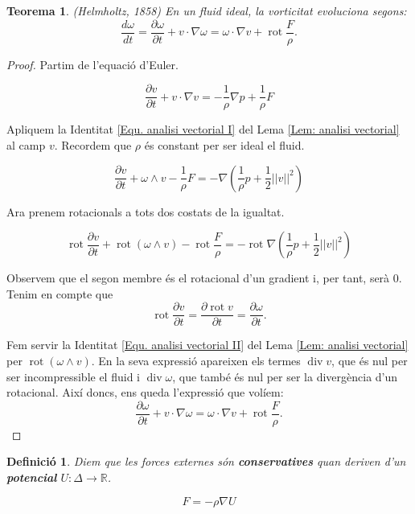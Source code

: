 \documentclass{article}
\numberwithin{equation}{section}
\DeclareMathOperator{\diver}{div}
\DeclareMathOperator{\rot}{rot}
\newtheorem{teorema}{Teorema}[section]
\newtheorem{definicio}{Definici\'{o}}[section]
\begin{document}
\begin{teorema}\label{Teo: Helmholtz}
(Helmholtz, 1858) En un fluid ideal, la vorticitat evoluciona segons:
\begin{equation}
\frac{d\omega}{dt}=\frac{\partial\omega}{\partial t}+v\cdot\nabla\omega=\omega\cdot\nabla v+\rot\frac{F}{\rho}.
\end{equation}
\end{teorema}
\begin{proof}
Partim de l'equaci\'{o} d'Euler.

\[\frac{\partial v}{\partial t}+v\cdot\nabla v=-\frac{1}{\rho}\nabla p+\frac{1}{\rho}F\]

Apliquem la Identitat \eqref{Equ. analisi vectorial I} del Lema \ref{Lem: analisi vectorial} al camp $v$. Recordem que $\rho$ \'{e}s constant per ser ideal el fluid.

\[\frac{\partial v}{\partial t}+\omega\wedge v-\frac{1}{\rho}F=-\nabla\left(\frac{1}{\rho}p+\frac{1}{2}||v||^2\right)\]

Ara prenem rotacionals a tots dos costats de la igualtat.

\[\rot\frac{\partial v}{\partial t}+\rot(\omega\wedge v)-\rot\frac{F}{\rho}=-\rot\nabla\left(\frac{1}{\rho}p+\frac{1}{2}||v||^2\right)\]

Observem que el segon membre \'{e}s el rotacional d'un gradient i, per tant, ser\`{a} 0. Tenim en compte que
\[\rot\frac{\partial v}{\partial t}=\frac{\partial\rot v}{\partial t}=\frac{\partial\omega}{\partial t}.\]

Fem servir la Identitat \eqref{Equ. analisi vectorial II} del Lema \ref{Lem: analisi vectorial} per $\rot(\omega\wedge v)$. En la seva expressi\'{o} apareixen els termes $\diver v$, que \'{e}s nul per ser incompressible el fluid i $\diver\omega$, que tamb\'{e} \'{e}s nul per ser la diverg\`{e}ncia d'un rotacional. Aix\'{i} doncs, ens queda l'expressi\'{o} que vol\'{i}em:
\[\frac{\partial\omega}{\partial t}+v\cdot\nabla\omega=\omega\cdot\nabla v+\rot\frac{F}{\rho}.\]
\end{proof}

\begin{definicio}
Diem que les forces externes s\'{o}n \textbf{conservatives} quan deriven d'un \textbf{potencial} $U:\Delta\rightarrow\mathbb{R}$.

\begin{equation}
F=-\rho\nabla U
\end{equation}
\end{definicio}
\end{document}

